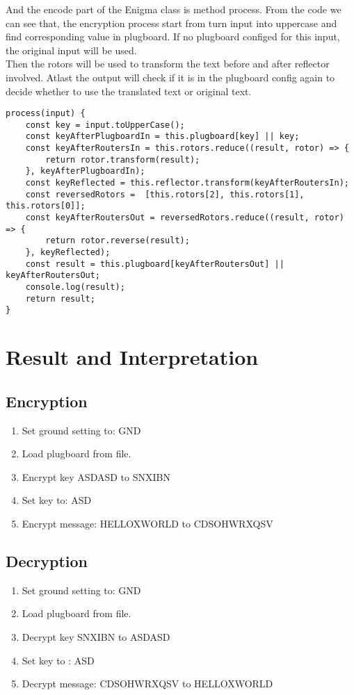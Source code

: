 \documentclass[11pt,a4paper]{article}
\begin{document}
And the encode part of the Enigma class is method process. From the code we can see that, the encryption process start from turn input into uppercase and find corresponding value in plugboard. If no plugboard configed for this input, the original input will be used.\\
Then the rotors will be used to transform the text before and after reflector involved.
Atlast the output will check if it is in the plugboard config again to decide whether to use the translated text or original text.
\begin{lstlisting}
process(input) {
    const key = input.toUpperCase();
    const keyAfterPlugboardIn = this.plugboard[key] || key;
    const keyAfterRoutersIn = this.rotors.reduce((result, rotor) => {
        return rotor.transform(result);
    }, keyAfterPlugboardIn);
    const keyReflected = this.reflector.transform(keyAfterRoutersIn);
    const reversedRotors =  [this.rotors[2], this.rotors[1], this.rotors[0]];
    const keyAfterRoutersOut = reversedRotors.reduce((result, rotor) => {
        return rotor.reverse(result);
    }, keyReflected);
    const result = this.plugboard[keyAfterRoutersOut] || keyAfterRoutersOut;
    console.log(result);
    return result;
}
\end{lstlisting}
\section{Result and Interpretation}
\subsection{Encryption}
\begin{enumerate}
\item Set ground setting to: GND
\item Load plugboard from file.
\item Encrypt key ASDASD to SNXIBN
\item Set key to: ASD
\item Encrypt message: HELLOXWORLD to CDSOHWRXQSV
\end{enumerate}

\subsection{Decryption}
\begin{enumerate}
\item Set ground setting to: GND
\item Load plugboard from file.
\item Decrypt key SNXIBN to ASDASD
\item Set key to : ASD
\item Decrypt message: CDSOHWRXQSV to HELLOXWORLD
\end{enumerate}

\nocite{*}

 
\end{document}
